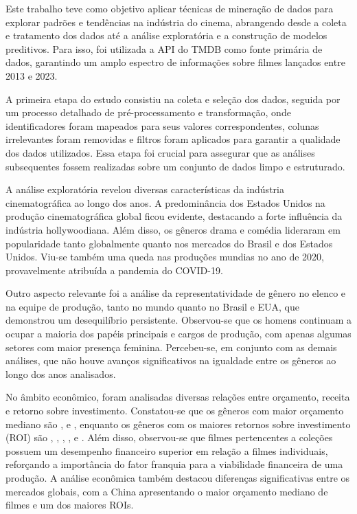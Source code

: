 Este trabalho teve como objetivo aplicar técnicas de mineração de dados para explorar padrões e tendências na indústria do cinema, abrangendo desde a coleta e tratamento dos dados até a análise exploratória e a construção de modelos preditivos. Para isso, foi utilizada a \acrshort{API} do \acrfull{TMDB} como fonte primária de dados, garantindo um amplo espectro de informações sobre filmes lançados entre 2013 e 2023.

A primeira etapa do estudo consistiu na coleta e seleção dos dados, seguida por um processo detalhado de pré-processamento e transformação, onde identificadores foram mapeados para seus valores correspondentes, colunas irrelevantes foram removidas e filtros foram aplicados para garantir a qualidade dos dados utilizados. Essa etapa foi crucial para assegurar que as análises subsequentes fossem realizadas sobre um conjunto de dados limpo e estruturado.

A análise exploratória revelou diversas características da indústria cinematográfica ao longo dos anos. A predominância dos Estados Unidos na produção cinematográfica global ficou evidente, destacando a forte influência da indústria hollywoodiana. Além disso, os gêneros drama e comédia lideraram em popularidade tanto globalmente quanto nos mercados do Brasil e dos Estados Unidos. Viu-se também uma queda nas produções mundias no ano de 2020, provavelmente atribuída a pandemia do COVID-19.

Outro aspecto relevante foi a análise da representatividade de gênero no elenco e na equipe de produção, tanto no mundo quanto no Brasil e EUA, que demonstrou um desequilíbrio persistente. Observou-se que os homens continuam a ocupar a maioria dos papéis principais e cargos de produção, com apenas algumas setores com maior presença feminina. Percebeu-se, em conjunto com as demais análises, que não houve avanços significativos na igualdade entre os gêneros ao longo dos anos analisados.

No âmbito econômico, foram analisadas diversas relações entre orçamento, receita e retorno sobre investimento. Constatou-se que os gêneros com maior orçamento mediano são ,  e , enquanto os gêneros com os maiores retornos sobre investimento (\acrshort{ROI}) são , , , ,  e . Além disso, observou-se que filmes pertencentes a coleções possuem um desempenho financeiro superior em relação a filmes individuais, reforçando a importância do fator franquia para a viabilidade financeira de uma produção. A análise econômica também destacou diferenças significativas entre os mercados globais, com a China apresentando o maior orçamento mediano de filmes e um dos maiores \acrshort{ROI}s.


